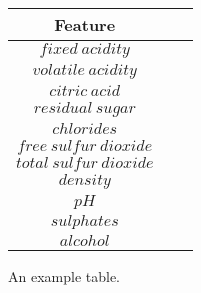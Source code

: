\begin{figure}[htb]
  \centering %

  \begin{tabular}{|c|c|c|} 
    \hline \hline %
    Feature \\ %
    \hline %
    $fixed~acidity$\\
    $volatile~acidity$\\
    $citric~acid$\\
    $residual~sugar$\\
    $chlorides$\\
    $free~sulfur~dioxide$\\
    $total~sulfur~dioxide$\\
    $density$\\
    $pH$\\
    $sulphates$\\
    $alcohol$\\
    \hline \hline
  \end{tabular}

  \caption{An example table.}
  \label{tab:attributes}
\end{figure}




